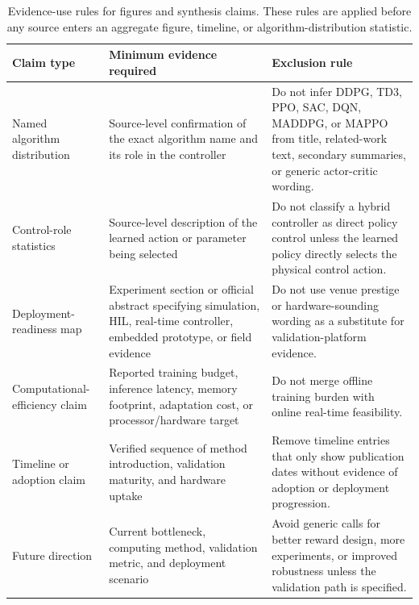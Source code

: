 \documentclass[manuscript,screen,review]{acmart}
\begin{document}
\begin{table}[t]
\caption{Evidence-use rules for figures and synthesis claims. These rules are applied before any source enters an aggregate figure, timeline, or algorithm-distribution statistic.}
\label{tab:evidence-use-rules}
\begin{tabular}{p{}p{}p{}}
\toprule
Claim type & Minimum evidence required & Exclusion rule \\
\midrule
Named algorithm distribution & Source-level confirmation of the exact algorithm name and its role in the controller & Do not infer DDPG, TD3, PPO, SAC, DQN, MADDPG, or MAPPO from title, related-work text, secondary summaries, or generic actor-critic wording. \\
Control-role statistics & Source-level description of the learned action or parameter being selected & Do not classify a hybrid controller as direct policy control unless the learned policy directly selects the physical control action. \\
Deployment-readiness map & Experiment section or official abstract specifying simulation, HIL, real-time controller, embedded prototype, or field evidence & Do not use venue prestige or hardware-sounding wording as a substitute for validation-platform evidence. \\
Computational-efficiency claim & Reported training budget, inference latency, memory footprint, adaptation cost, or processor/hardware target & Do not merge offline training burden with online real-time feasibility. \\
Timeline or adoption claim & Verified sequence of method introduction, validation maturity, and hardware uptake & Remove timeline entries that only show publication dates without evidence of adoption or deployment progression. \\
Future direction & Current bottleneck, computing method, validation metric, and deployment scenario & Avoid generic calls for better reward design, more experiments, or improved robustness unless the validation path is specified. \\
\bottomrule
\end{tabular}
\end{table}
\end{document}

